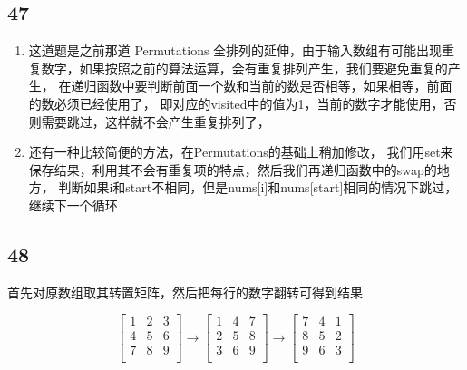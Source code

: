 \documentclass[12pt,a4paper]{article}
\begin{document}
\subsection{47}
\begin{enumerate}
\item
\begin{CJK}{UTF8}{gbsn}
这道题是之前那道 Permutations 全排列的延伸，由于输入数组有可能出现重复数字，如果按照之前的算法运算，会有重复排列产生，我们要避免重复的产生，
在递归函数中要判断前面一个数和当前的数是否相等，如果相等，前面的数必须已经使用了，
即对应的visited中的值为1，当前的数字才能使用，否则需要跳过，这样就不会产生重复排列了，
\end{CJK}
\item
\begin{CJK}{UTF8}{gbsn}
还有一种比较简便的方法，在Permutations的基础上稍加修改，
我们用set来保存结果，利用其不会有重复项的特点，然后我们再递归函数中的swap的地方，
判断如果i和start不相同，但是nums[i]和nums[start]相同的情况下跳过，继续下一个循环
\end{CJK}
\end{enumerate}

\subsection{48}
\begin{CJK}{UTF8}{gbsn}
首先对原数组取其转置矩阵，然后把每行的数字翻转可得到结果
\end{CJK}
\[
  \begin{bmatrix}
    1 & 2 & 3  \\
    4 & 5 & 6  \\
	7 & 8 & 9  \\
  \end{bmatrix}
  \rightarrow
  \begin{bmatrix}
    1 & 4 & 7  \\
    2 & 5 & 8  \\
	3 & 6 & 9  \\
  \end{bmatrix}
  \rightarrow
  \begin{bmatrix}
    7 & 4 & 1  \\
    8 & 5 & 2  \\
	9 & 6 & 3  \\
  \end{bmatrix}
\]
\end{document}
